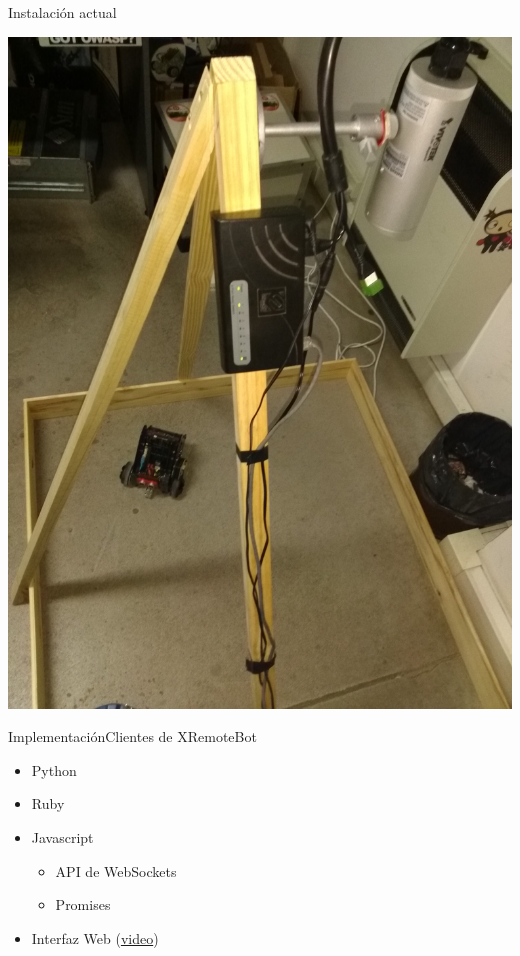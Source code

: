 \documentclass{beamer}
\begin{document}
\begin{frame}{Instalación actual}
\begin{minipage}{0.5\linewidth}
        \includegraphics[width=\linewidth]{images/inst2}
    \end{minipage}
\end{frame}

\begin{frame}{Implementación}{Clientes de XRemoteBot}
    \begin{itemize}[<+->]
        \item Python
        \item Ruby
        \item Javascript
        \begin{itemize}
            \item API de WebSockets
            \item Promises
        \end{itemize}
        \item Interfaz Web (\href{run:ejemplos/interfaz.mp4}{video})
    \end{itemize}
\end{frame}
\end{document}
